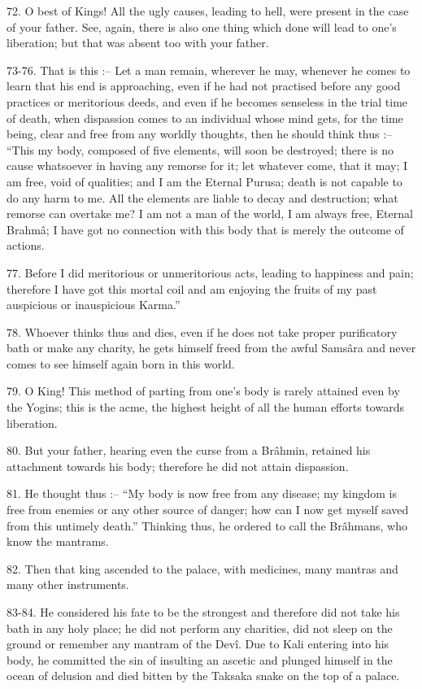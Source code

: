72. O best of Kings! All the ugly causes, leading to hell, were present in the case of your father. See, again, there is also one thing which done will lead to one's liberation; but that was absent too with your father.

73-76. That is this :-- Let a man remain, wherever he may, whenever he comes to learn that his end is approaching, even if he had not practised before any good practices or meritorious deeds, and even if he becomes senseless in the trial time of death, when dispassion comes to an individual whose mind gets, for the time being, clear and free from any worldly thoughts, then he should think thus :-- ``This my body, composed of five elements, will soon be destroyed; there is no cause whatsoever in having any remorse for it; let whatever come, that it may; I am free, void of qualities; and I am the Eternal Purusa; death is not capable to do any harm to me. All the elements are liable to decay and destruction; what remorse can overtake me? I am not a man of the world, I am always free, Eternal Brahm\^a; I have got no connection with this body that is merely the outcome of actions.

77. Before I did meritorious or unmeritorious acts, leading to happiness and pain; therefore I have got this mortal coil and am enjoying the fruits of my past auspicious or inauspicious Karma.''

78. Whoever thinks thus and dies, even if he does not take proper purificatory bath or make any charity, he gets himself freed from the awful Sams\^ara and never comes to see himself again born in this world.

79. O King! This method of parting from one's body is rarely attained even by the Yogins; this is the acme, the highest height of all the human efforts towards liberation.

80. But your father, hearing even the curse from a Br\^ahmin, retained his attachment towards his body; therefore he did not attain dispassion.

81. He thought thus :-- ``My body is now free from any disease; my kingdom is free from enemies or any other source of danger; how can I now get myself saved from this untimely death.'' Thinking thus, he ordered to call the Br\^ahmans, who know the mantrams.

82. Then that king ascended to the palace, with medicines, many mantras and many other instruments.

83-84. He considered his fate to be the strongest and therefore did not take his bath in any holy place; he did not perform any charities, did not sleep on the ground or remember any mantram of the Dev\^i. Due to Kali entering into his body, he committed the sin of insulting an ascetic and plunged himself in the ocean of delusion and died bitten by the Taksaka snake on the top of a palace.

